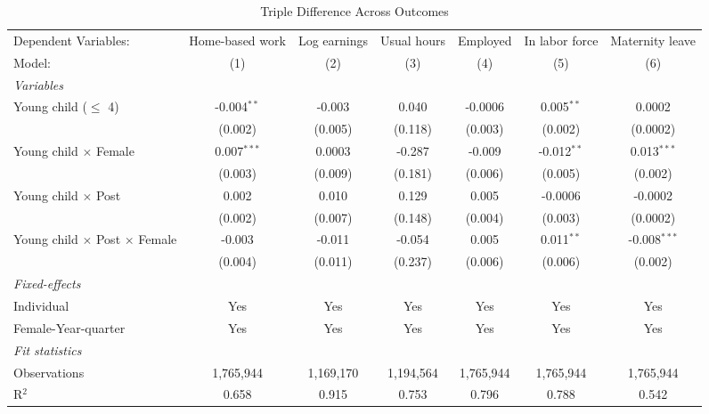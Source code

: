
\begin{table}[H]
   \caption{\label{tab:triple_diff_outcomes} Triple Difference Across Outcomes}
   \centering
\footnotesize\setlength{\tabcolsep}{3pt}
   \begin{tabular}{lcccccc}
      \toprule
      Dependent Variables:                        & Home-based work & Log earnings & Usual hours & Employed  & In labor force & Maternity leave\\  
      Model:                                      & (1)             & (2)          & (3)         & (4)       & (5)            & (6)\\  
      \midrule
      \emph{Variables}\\
      Young child ($\leq$ 4)                      & -0.004$^{**}$   & -0.003       & 0.040       & -0.0006   & 0.005$^{**}$   & 0.0002\\   
                                                  & (0.002)         & (0.005)      & (0.118)     & (0.003)   & (0.002)        & (0.0002)\\   
\addlinespace[2pt]
      Young child $\times$ Female                 & 0.007$^{***}$   & 0.0003       & -0.287      & -0.009    & -0.012$^{**}$  & 0.013$^{***}$\\   
                                                  & (0.003)         & (0.009)      & (0.181)     & (0.006)   & (0.005)        & (0.002)\\   
\addlinespace[2pt]
      Young child $\times$ Post                   & 0.002           & 0.010        & 0.129       & 0.005     & -0.0006        & -0.0002\\   
                                                  & (0.002)         & (0.007)      & (0.148)     & (0.004)   & (0.003)        & (0.0002)\\   
\addlinespace[2pt]
      Young child $\times$ Post $\times$ Female   & -0.003          & -0.011       & -0.054      & 0.005     & 0.011$^{**}$   & -0.008$^{***}$\\   
                                                  & (0.004)         & (0.011)      & (0.237)     & (0.006)   & (0.006)        & (0.002)\\   
\addlinespace[2pt]
      \midrule
      \emph{Fixed-effects}\\
      Individual                                  & Yes             & Yes          & Yes         & Yes       & Yes            & Yes\\  
      Female-Year-quarter                         & Yes             & Yes          & Yes         & Yes       & Yes            & Yes\\  
      \midrule
      \emph{Fit statistics}\\
      Observations                                & 1,765,944       & 1,169,170    & 1,194,564   & 1,765,944 & 1,765,944      & 1,765,944\\  
      R$^2$                                       & 0.658           & 0.915        & 0.753       & 0.796     & 0.788          & 0.542\\  
\bottomrule
   \end{tabular}
   

\end{table}
